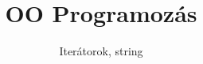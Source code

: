 \documentclass[usenames,dvipsnames,aspectratio=169]{beamer}
\title[OO Programozás - C++]{OO Programozás}
\subtitle{Iterátorok, string}
\begin{document}
\begin{frame}[plain]
  \titlepage
  \logoalul
\end{frame}




\end{document}
